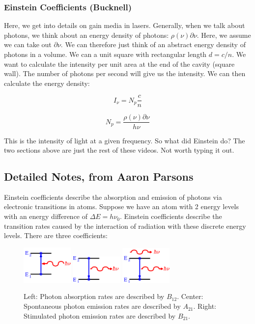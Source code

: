 \documentclass{article}
\def\ato{{A_{21}}}
\def\ato{{A_{21}}}
\def\ato{{A_{21}}}
\begin{document}
\subsubsection{Einstein Coefficients (Bucknell)}

Here, we get into details on gain media in lasers. Generally, when we talk about photons, we think about an energy density of photons: $\rho(\nu) \partial \nu$. Here, we assume we can take out $\partial \nu$. We can therefore just think of an abstract energy density of photons in a volume. We can a unit square with rectangular length $d=c/n$. We want to calculate the intensity per unit area at the end of the cavity (square wall). The number of photons per second will give us the intensity. We can then calculate the energy density:

\begin{equation}
    I_\nu = N_p \frac{c}{n}
\end{equation}

\begin{equation}
    N_p = \frac{\rho(\nu)\partial \nu}{h \nu}
\end{equation}

This is the intensity of light at a given frequency. So what did Einstein do? The two sections above are just the rest of these videos. Not worth typing it out.

\subsection{Detailed Notes, from Aaron Parsons}

Einstein coefficients describe the absorption and emission of photons via electronic transitions in atoms.  
Suppose we have an atom with 2 energy levels with an energy difference of $\Delta E=h\nu_0$.  Einstein coefficients describe the 
transition rates caused by the interaction of radiation with these discrete energy
levels. There are three coefficients:

\begin{figure}\centering
\includegraphics[width=1in]{B12.png}
\includegraphics[width=1in]{A21.png}
\includegraphics[width=1in]{B21.png}
\caption{Left: Photon absorption rates are described by $B_{12}$.  Center: Spontaneous photon emission rates are described by $\ato$.  Right: Stimulated photon emission rates are described by $B_{21}$.}
\end{figure}
\end{document}
